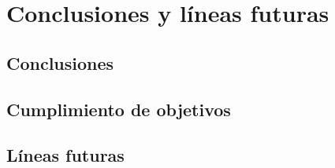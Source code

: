 
\chapter{Conclusiones y líneas futuras}
\label{cha:conclusiones}

\section{Conclusiones}
\label{sec:concl-conclusiones}


\section{Cumplimiento de objetivos}
\label{sec:concl-objetivos}


\section{Líneas futuras}
\label{sec:concl-futuro}










